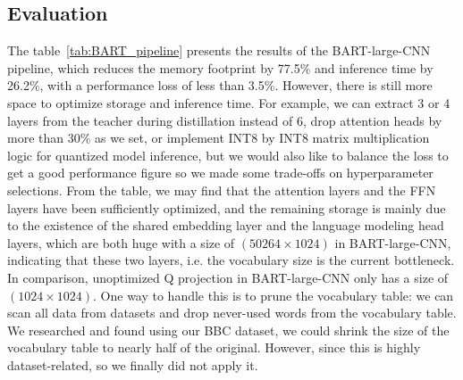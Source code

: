 \documentclass{article}
\begin{document}
    \subsection{Evaluation}
    \hspace*{1em} The table~\ref{tab:BART_pipeline} presents the results of the BART-large-CNN pipeline, which reduces the memory footprint by 77.5\% and inference time by 26.2\%, with a performance loss of less than 3.5\%. However, there is still more space to optimize storage and inference time. For example, we can extract 3 or 4 layers from the teacher during distillation instead of 6, drop attention heads by more than 30\% as we set, or implement INT8 by INT8 matrix multiplication logic for quantized model inference, but we would also like to balance the loss to get a good performance figure so we made some trade-offs on hyperparameter selections. From the table, we may find that the attention layers and the FFN layers have been sufficiently optimized, and the remaining storage is mainly due to the existence of the shared embedding layer and the language modeling head layers, which are both huge with a size of $(50264 \times 1024)$ in BART-large-CNN, indicating that these two layers, i.e. the vocabulary size is the current bottleneck. In comparison, unoptimized Q projection in BART-large-CNN only has a size of $(1024 \times 1024)$. One way to handle this is to prune the vocabulary table: we can scan all data from datasets and drop never-used words from the vocabulary table. We researched and found using our BBC dataset, we could shrink the size of the vocabulary table to nearly half of the original. However, since this is highly dataset-related, so we finally did not apply it.
\end{document}
